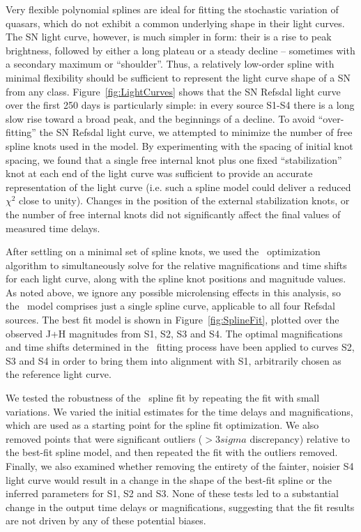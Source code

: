 Very flexible polynomial splines are ideal for fitting the stochastic variation of quasars, which do not exhibit a common underlying shape in their light curves.  The SN light curve, however, is much simpler in form: their is a rise to peak brightness, followed by either a long plateau or a steady decline -- sometimes with a secondary maximum or ``shoulder''.  Thus, a relatively low-order spline with minimal flexibility should be sufficient to represent the light curve shape of a SN from any class.  Figure~\ref{fig:LightCurves} shows that the SN Refsdal light curve over the first 250 days is particularly simple: in every source S1-S4 there is a long slow rise toward a broad peak, and the beginnings of a decline.  To avoid ``over-fitting'' the SN Refsdal light curve, we attempted to minimize the number of free spline knots used in the \pycs model.  By experimenting with the spacing of initial knot spacing, we found that a single free internal knot plus one fixed ``stabilization'' knot at each end of the light curve was sufficient to provide an accurate representation of the light curve (i.e. such a spline model could deliver a reduced $\chi^2$ close to unity).  Changes in the position of the external stabilization knots, or the number of free internal  knots did not significantly affect the final values of measured time delays. 

After settling on a minimal set of spline knots, we used the \pycs\ optimization algorithm to simultaneously solve for the relative magnifications and time shifts for each light curve, along with the spline knot positions and magnitude values.   As noted above, we ignore any possible microlensing effects in this analysis, so the \pycs\ model comprises just a single spline curve, applicable to all four Refsdal sources. The best fit model is shown in Figure~\ref{fig:SplineFit}, plotted over the observed J+H magnitudes from S1, S2, S3 and S4.  The optimal magnifications and time shifts determined in the \pycs\ fitting process have been applied to curves S2, S3 and S4 in order to bring them into alignment with S1, arbitrarily chosen as the reference light curve.

We tested the robustness of the \pycs\ spline fit by repeating the fit with small variations.  We varied the initial estimates for the time delays and magnifications, which are used as a starting point for the spline fit optimization. We also removed points that were significant outliers ($>3sigma$ discrepancy) relative to the best-fit spline model, and then repeated the fit with the outliers removed. Finally, we also examined whether removing the entirety of the fainter, noisier S4 light curve would result in a change in the shape of the best-fit spline or the inferred parameters for S1, S2 and S3.   None of these tests led to a substantial change in the output time delays or magnifications, suggesting that the fit results are not driven by any of these potential biases.

